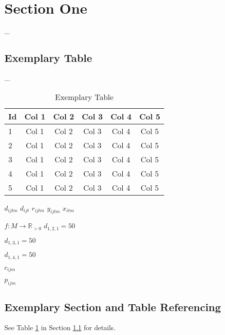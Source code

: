 \clearpage
\section{Section One}
\label{sec:Intro}
...

\subsection{Exemplary Table}
\label{subsec:Intro/table}
...

\begin{longtable}{l|ccccc}
  \caption{Exemplary Table}
  \label{table:table-1}
  \\
  \textbf{Id} & \textbf{Col 1} & \textbf{Col 2}& \textbf{Col 3} & \textbf{Col 4} & \textbf{Col 5}\\
  \hline
  1 & Col 1 & Col 2 & Col 3 & Col 4 & Col 5\\
  2 & Col 1 & Col 2 & Col 3 & Col 4 & Col 5\\
  3 & Col 1 & Col 2 & Col 3 & Col 4 & Col 5\\
  4 & Col 1 & Col 2 & Col 3 & Col 4 & Col 5\\
  5 & Col 1 & Col 2 & Col 3 & Col 4 & Col 5\\
\end{longtable}

\Huge \(d_{ijtm}\)
\Huge \(d_{ijt}\)
\Huge \(r_{ijtm}\)
\Huge \(y_{ijtm}\)
\Huge \(x_{itm}\)

\Huge \(f: M \rightarrow \mathbb{R}_{>0}\)
\Huge \(d_{1,2,1} = 50\)  
  
\Huge \(d_{1,3,1} = 50\)
  
\Huge \(d_{1,4,1} = 50\)
    
\Huge \(c_{ijm}\)

  
\Huge \(p_{ijm}\)



\subsection{Exemplary Section and Table Referencing}
\label{subsec:Intro/rfs}

See Table \ref{table:table-1} in Section \ref{subsec:Intro/table}  for details.